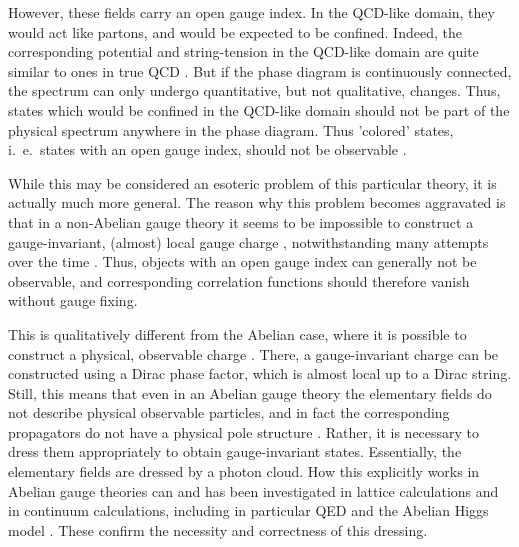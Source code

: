 \documentclass[final,twoside,12pt]{article}
\newcommand*{\1}{1\!\!\!\bot}
\begin{document}
However, these fields carry an open gauge index. In the QCD-like domain, they would act like partons, and would be expected to be confined. Indeed, the corresponding potential and string-tension in the QCD-like domain are quite similar to ones in true QCD \cite{Knechtli:1999qe,Knechtli:1998gf}. But if the phase diagram is continuously connected, the spectrum can only undergo quantitative, but not qualitative, changes. Thus, states which would be confined in the QCD-like domain should not be part of the physical spectrum anywhere in the phase diagram. Thus 'colored' states, i.\ e.\ states with an open gauge index, should not be observable \cite{'tHooft:1979bj,Banks:1979fi,Frohlich:1980gj}.

While this may be considered an esoteric problem of this particular theory, it is actually much more general. The reason why this problem becomes aggravated is that in a non-Abelian gauge theory it seems to be impossible to construct a gauge-invariant, (almost) local gauge charge \cite{Haag:1992hx,Ilderton:2007qy,Heinzl:2008bu,Strocchi:2013awa}, notwithstanding many attempts over the time \cite{Lavelle:1995ty,Polyakov:1978vu,Susskind:1979up,Gross:1980br,Marchesini:1981kt,Bagan:1999jf,Bagan:1999jk,Ilderton:2007qy,Lavelle:2011yc,Heinzl:2008bu}. Thus, objects with an open gauge index can generally not be observable, and corresponding correlation functions should therefore vanish without gauge fixing.

This is qualitatively different from the Abelian case, where it is possible to construct a physical, observable charge \cite{Frere:1974ia,Haag:1992hx,Heinzl:2008bu,Rubakov:2002fi}. There, a gauge-invariant charge can be constructed using a Dirac phase factor, which is almost local up to a Dirac string. Still, this means that even in an Abelian gauge theory the elementary fields do not describe physical observable particles, and in fact the corresponding propagators do not have a physical pole structure \cite{Maris:1996zg,Alkofer:2000wg}. Rather, it is necessary to dress them appropriately to obtain gauge-invariant states. Essentially, the elementary fields are dressed by a photon cloud. How this explicitly works in Abelian gauge theories can and has been investigated in lattice calculations and in continuum calculations, including in particular QED and the Abelian Higgs model \cite{Woloshyn:2017rhe,Evertz:1986ur,Fradkin:1978dv,Frere:1974ia,Haag:1992hx,Montvay:1994cy,Buchmuller:1995xm,Lavelle:2011yc,Lucini:2015hfa}. These confirm the necessity and correctness of this dressing.
\end{document}
